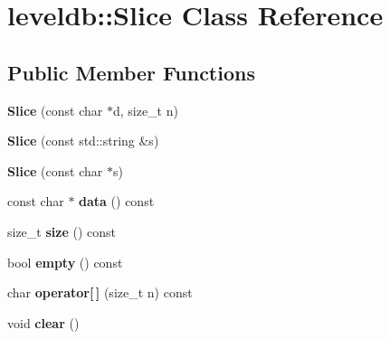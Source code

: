 \hypertarget{classleveldb_1_1_slice}{}\section{leveldb\+::Slice Class Reference}
\label{classleveldb_1_1_slice}
\subsection*{Public Member Functions}
\begin{DoxyCompactItemize}
\item 
\mbox{\label{classleveldb_1_1_slice_ae77bd1d4353bd94d768474d467657c85}} 
{\bfseries Slice} (const char $\ast$d, size\+\_\+t n)
\item 
\mbox{\label{classleveldb_1_1_slice_ab79b60f33aa094179fe36880bc220853}} 
{\bfseries Slice} (const std\+::string \&s)
\item 
\mbox{\label{classleveldb_1_1_slice_a429c530560405fe1a7cd745f7afecf5a}} 
{\bfseries Slice} (const char $\ast$s)
\item 
\mbox{\label{classleveldb_1_1_slice_a94ccee3d05b66ba0b059f2d9772b782b}} 
const char $\ast$ {\bfseries data} () const
\item 
\mbox{\label{classleveldb_1_1_slice_a7344120beda110de81d0c45d4cfe4b63}} 
size\+\_\+t {\bfseries size} () const
\item 
\mbox{\label{classleveldb_1_1_slice_a56ac7a70125c26187ecf4dd040004582}} 
bool {\bfseries empty} () const
\item 
\mbox{\label{classleveldb_1_1_slice_aea62da83ffa80f22e065b15ca8596726}} 
char {\bfseries operator\mbox{[}$\,$\mbox{]}} (size\+\_\+t n) const
\item 
\mbox{\label{classleveldb_1_1_slice_ab9b6e340e8a483a5cf713f6be17709e3}} 
void {\bfseries clear} ()
\item 
\mbox{\label{classleveldb_1_1_slice_a1be5b22958a115ebecb2b017aad2b3f6}} 

\end{DoxyCompactItemize}
